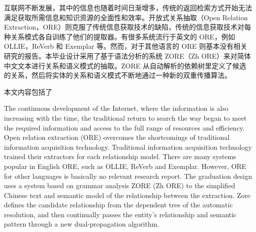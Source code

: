 ﻿\begin{cnabstract}
互联网不断发展，其中的信息也随着时间日渐增多，传统的返回检索方式开始无法满足获取所需信息和知识资源的全面性和效率。开放式关系抽取（Open Relation Extraction，ORE）则克服了传统信息获取技术的缺陷，传统的信息获取技术对每种关系模式各自训练了他们的提取器。有很多系统流行于英文的 ORE，例如 OLLIE，ReVerb 和 Exemplar 等。然而，对于其他语言的 ORE 则基本没有相关研究的报告。本毕业设计采用了基于语法分析的系统 ZORE（Zh ORE）来对简体中文文本进行关系和语义模式的抽取。ZORE 从自动解析的依赖树里定义了候选的关系，然后将实体的关系和语义模式不断地通过一种新的双重传播算法。

本文内容包括了

\end{cnabstract}

\begin{enabstract}
The continuous development of the Internet, where the information is also increasing with the time, the traditional return to search the way began to meet the required information and access to the full range of resources and efficiency. Open relation extraction (ORE) overcomes the shortcomings of traditional information acquisition technology. Traditional information acquisition technology trained their extractors for each relationship model. There are many systems popular in English ORE, such as OLLIE, ReVerb and Exemplar. However, ORE for other languages is basically no relevant research report. The graduation design uses a system based on grammar analysis ZORE (Zh ORE) to the simplified Chinese text and semantic model of the relationship between the extraction. Zore defines the candidate relationship from the dependent tree of the automatic resolution, and then continually passes the entity's relationship and semantic pattern through a new dual-propagation algorithm.

\end{enabstract}
